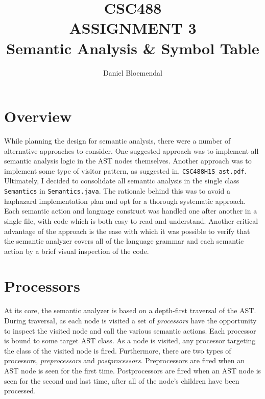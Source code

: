 \documentclass[oneside]{amsart}
\theoremstyle{definition}
\theoremstyle{remark}
\numberwithin{equation}{section}
\begin{document}
\title[CSC488 A3]{CSC488\\ASSIGNMENT 3\\Semantic Analysis \& Symbol Table}
\author{Daniel Bloemendal}

\begin{titlepage}
\maketitle
\thispagestyle{empty}
\tableofcontents
\end{titlepage}

\section{Overview}
While planning the design for semantic analysis, there were a number of
alternative approaches to consider. One suggested approach was to implement all
semantic analysis logic in the AST nodes themselves. Another approach was to
implement some type of visitor pattern, as suggested in,
\texttt{CSC488H1S\_ast.pdf}. Ultimately, I decided to consolidate all semantic
analysis in the single class \texttt{Semantics} in \texttt{Semantics.java}. The
rationale behind this was to avoid a haphazard implementation plan and opt for a
thorough systematic approach. Each semantic action and language construct was
handled one after another in a single file, with code which is both easy to read
and understand. Another critical advantage of the approach is the ease with
which it was possible to verify that the semantic analyzer covers all of the
language grammar and each semantic action by a brief visual inspection of the
code.

\section{Processors}
At its core, the semantic analyzer is based on a depth-first traversal of the
AST. During traversal, as each node is visited a set of \emph{processors} have
the opportunity to inspect the visited node and call the various semantic
actions. Each processor is bound to some target AST class. As a node is visited,
any processor targeting the class of the visited node is fired. Furthermore,
there are two types of processors, \emph{preprocessors} and
\emph{postprocessors}. Preprocessors are fired when an AST node is seen for the
first time. Postprocessors are fired when an AST node is seen for the second and
last time, after all of the node's children have been processed.
\end{document}
